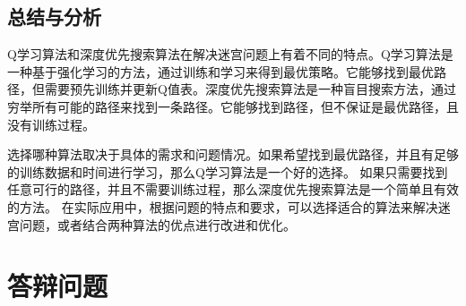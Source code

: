 \documentclass[UTF8,titlepage]{ctexart}
\numberwithin{figure}{section}
\begin{document}
\subsection{总结与分析}
Q学习算法和深度优先搜索算法在解决迷宫问题上有着不同的特点。Q学习算法是一种基于强化学习的方法，通过训练和学习来得到最优策略。它能够找到最优路径，但需要预先训练并更新Q值表。深度优先搜索算法是一种盲目搜索方法，通过穷举所有可能的路径来找到一条路径。它能够找到路径，但不保证是最优路径，且没有训练过程。

选择哪种算法取决于具体的需求和问题情况。如果希望找到最优路径，并且有足够的训练数据和时间进行学习，那么Q学习算法是一个好的选择。
如果只需要找到任意可行的路径，并且不需要训练过程，那么深度优先搜索算法是一个简单且有效的方法。
在实际应用中，根据问题的特点和要求，可以选择适合的算法来解决迷宫问题，或者结合两种算法的优点进行改进和优化。

\clearpage

\section{答辩问题}
\end{document}
